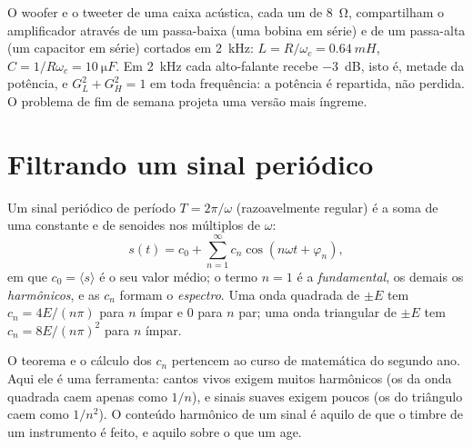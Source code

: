 \begin{example}\label{ex:b1:filters-transfer-functions:crossover}
O woofer e o tweeter de uma caixa acústica, cada um de \qty{8}{\ohm}, compartilham o
amplificador através de um passa-baixa (uma bobina em série) e de um passa-alta (um capacitor
em série) cortados em \qty{2}{kHz}: $L = R/\omega_c = \qty{0.64}{mH}$,
$C = 1/R\omega_c = \qty{10}{\micro F}$. Em \qty{2}{kHz} cada alto-falante recebe
\qty{-3}{dB}, isto é, metade da potência, e $G_L^2 + G_H^2 = 1$ em toda
frequência: a potência é repartida, não perdida. O problema de fim de semana projeta
uma versão mais íngreme.
\end{example}

\section{Filtrando um sinal periódico}

\begin{theorem}\label{thm:b1:filters-transfer-functions:fourier}
Um sinal periódico de período $T = 2\pi/\omega$ (razoavelmente regular) é
a soma de uma constante e de senoides nos múltiplos de $\omega$:
\[
s(t) = c_0 + \sum_{n = 1}^{\infty} c_n\cos(n\omega t + \varphi_n),
\]
em que $c_0 = \langle s\rangle$ é o seu valor médio; o termo $n = 1$ é a
\emph{fundamental}, os demais os \emph{harmônicos}, e as
 $c_n$ formam o \emph{espectro}. Uma onda quadrada de 
$\pm E$ tem $c_n = 4E/(n\pi)$ para $n$ ímpar e $0$ para $n$ par; uma
onda triangular de  $\pm E$ tem $c_n = 8E/(n\pi)^2$ para $n$ ímpar.
\end{theorem}
\admitted

\begin{remark}\label{rem:b1:filters-transfer-functions:fourier}
O teorema e o cálculo dos $c_n$ pertencem ao curso de matemática
do segundo ano. Aqui ele é uma ferramenta: cantos vivos exigem muitos
harmônicos (os da onda quadrada caem apenas como $1/n$), e sinais suaves
exigem poucos (os do triângulo caem como $1/n^2$). O conteúdo harmônico de um sinal é
aquilo de que o timbre de um instrumento é feito, e aquilo sobre o que um  age.
\end{remark}

